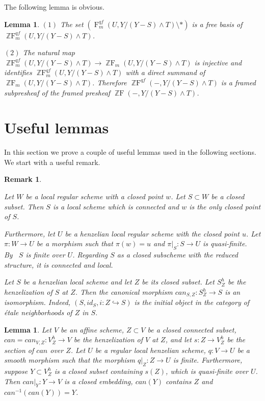 \documentclass[a4paper,11pt,reqno]{amsart}
\newtheorem{lemma}[theorem]{Lemma}
\newtheorem{remark}[theorem]{Remark}
\begin{document}
The following lemma is obvious.

\begin{lemma}\label{l:ZF_qf_m_and_ZF_m}
$(1)$ The set $({\operatorname{F}}^{qf}_m(U,Y/(Y-S)\wedge T)\setminus{*})$ is a free
basis of ${\operatorname{\mathbb{Z}F}}^{qf}_m(U,Y/(Y-S)\wedge T)$.

$(2)$ The natural map ${\operatorname{\mathbb{Z}F}}^{qf}_m(U,Y/(Y-S)\wedge T) \to
{\operatorname{\mathbb{Z}F}}_m(U,Y/(Y-S)\wedge T)$ is injective and identifies
${\operatorname{\mathbb{Z}F}}^{qf}_m(U,Y/(Y-S)\wedge T)$ with a direct summand of
${\operatorname{\mathbb{Z}F}}_m(U,Y/(Y-S)\wedge T)$. Therefore ${\operatorname{\mathbb{Z}F}}^{qf}(-,Y/(Y-S)\wedge T)$
is a framed subpresheaf of the framed presheaf ${\operatorname{\mathbb{Z}F}}(-,Y/(Y-S)\wedge
T)$.
\end{lemma}

\section{Useful lemmas}

In this section we prove a couple of useful lemmas used in the
following sections. We start with a useful remark.

\begin{remark}\label{r:henselian_properties}{\rm
Let $W$ be a local regular scheme with a closed point $w$. Let
$S\subset W$ be a closed subset. Then $S$ is a local scheme which is
connected and $w$ is the only closed point of $S$.

Furthermore, let $U$ be a henzelian local regular scheme with the
closed point $u$. Let $\pi: W\to U$ be a morphism such that
$\pi(w)=u$ and $\pi|_S: S\to U$ is quasi-finite. By~\cite[Theorem
I.4.2]{Mi} $S$ is finite over $U$. Regarding $S$ as a closed
subscheme with the reduced structure, it is connected and local.

Let $S$ be a henzelian local scheme and let $Z$ be its closed
subset. Let $S^h_Z$ be the henzelization of $S$ at $Z$. Then the
canonical morphism $can_{S,Z}:S^h_Z \to S$ is an isomorphism.
Indeed, $(S,id_S,i:Z\hookrightarrow S)$ is the initial object in the
category of \'{e}tale neighborhoods of $Z$ in $S$.

}\end{remark}

\begin{lemma}\label{l:closed-embedding}
Let $V$ be an affine scheme, $Z\subset V$ be a closed connected
subset, $can=can_{V,Z}:V^h_Z \to V$ be the henzelization of $V$ at
$Z$, and let $s:Z\to V^h_Z$ be the section of $can$ over $Z$. Let
$U$ be a regular local henzelian scheme, $q:V\to U$ be a smooth
morphism such that the morphism $q|_Z:Z\to U$ is finite.
Furthermore, suppose $Y\subset V^h_Z$ is a closed subset containing
$s(Z)$, which is quasi-finite over $U$. Then $can|_Y: Y\to V$ is a
closed embedding, $can(Y)$ contains $Z$ and $can^{-1}(can(Y))=Y$.
\end{lemma}
\end{document}
